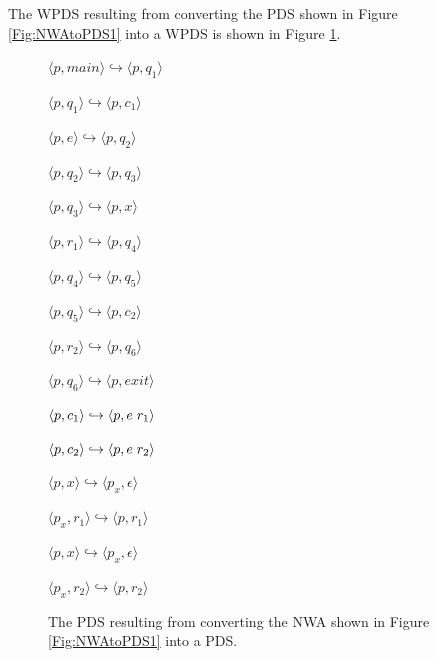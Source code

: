 \documentclass{llncs}
\begin{document}
\noindent The WPDS resulting from converting the PDS shown in Figure \ref{Fig:NWAtoPDS1} into a WPDS is shown in Figure \ref{Fig:NWAtoPDS2}. \\

\begin{figure}[htbp]
  \centering
    \begin{description}
      \centering
      \item $\langle p,main \rangle \hookrightarrow \langle p,q_1 \rangle$
      \item $\langle p,q_1 \rangle \hookrightarrow \langle p,c_1 \rangle$
      \item $\langle p,e \rangle \hookrightarrow \langle p,q_2 \rangle$
      \item $\langle p,q_2 \rangle \hookrightarrow \langle p,q_3 \rangle$
      \item $\langle p,q_3 \rangle \hookrightarrow \langle p,x \rangle$
      \item $\langle p,r_1 \rangle \hookrightarrow \langle p,q_4 \rangle$
      \item $\langle p,q_4 \rangle \hookrightarrow \langle p,q_5 \rangle$
      \item $\langle p,q_5 \rangle \hookrightarrow \langle p,c_2 \rangle$
      \item $\langle p,r_2 \rangle \hookrightarrow \langle p,q_6 \rangle$
      \item $\langle p,q_6 \rangle \hookrightarrow \langle p,exit \rangle$
      \item $\langle p,c_1 \rangle \hookrightarrow \langle p,e \hspace{.1cm} r_1 \rangle$
      \item $\langle p,c_2 \rangle \hookrightarrow \langle p,e \hspace{.1cm} r_2 \rangle$
      \item $\langle p,x \rangle \hookrightarrow \langle p_x, \epsilon \rangle$
      \item $\langle p_x,r_1 \rangle \hookrightarrow \langle p,r_1 \rangle$
      \item $\langle p,x \rangle \hookrightarrow \langle p_x, \epsilon \rangle$
      \item $\langle p_x,r_2 \rangle \hookrightarrow \langle p,r_2 \rangle$
    \end{description}
  \caption{The PDS resulting from converting the NWA shown in Figure \ref{Fig:NWAtoPDS1} into a PDS.}
  \label{Fig:NWAtoPDS2}
\end{figure}
\end{document}

